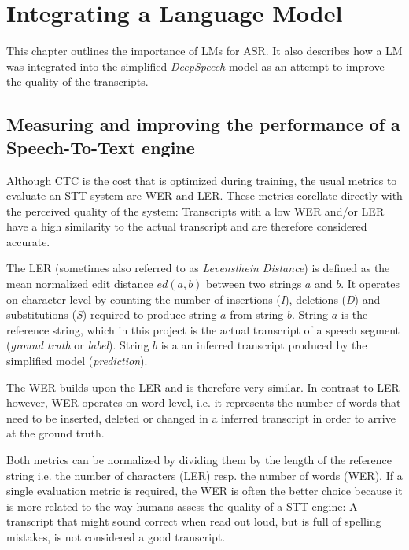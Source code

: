 \section{Integrating a Language Model}\label{lm}

This chapter outlines the importance of \ac{LM}s for \ac{ASR}. It also describes how a \ac{LM} was integrated into the simplified \textit{DeepSpeech} model as an attempt to improve the quality of the transcripts.

\subsection{Measuring and improving the performance of a Speech-To-Text engine}

Although \ac{CTC} is the cost that is optimized during training, the usual metrics to evaluate an \ac{STT} system are \ac{WER} and \ac{LER}. These metrics corellate directly with the perceived quality of the system: Transcripts with a low \ac{WER} and/or \ac{LER} have a high similarity to the actual transcript and are therefore considered accurate.

The \ac{LER} (sometimes also referred to as \textit{Levensthein Distance}) is defined as the mean normalized edit distance $ed(a, b)$ between two strings $a$ and $b$. It operates on character level by counting the number of insertions (\textit{I}), deletions (\textit{D}) and substitutions (\textit{S}) required to produce string $a$ from string $b$. String $a$ is the reference string, which in this project is the actual transcript of a speech segment (\textit{ground truth} or \textit{label}). String $b$ is a an inferred transcript produced by the simplified model (\textit{prediction}).  

The \ac{WER} builds upon the \ac{LER} and is therefore very similar. In contrast to \ac{LER} however, \ac{WER} operates on word level, i.e. it represents the number of words that need to be inserted, deleted or changed in a inferred transcript in order to arrive at the ground truth.

Both metrics can be normalized by dividing them by the length of the reference string i.e. the number of characters (\ac{LER}) resp. the number of words (\ac{WER}). If a single evaluation metric is required, the \ac{WER} is often the better choice because it is more related to the way humans assess the quality of a \ac{STT} engine: A transcript that might sound correct when read out loud, but is full of spelling mistakes, is not considered a good transcript. 


